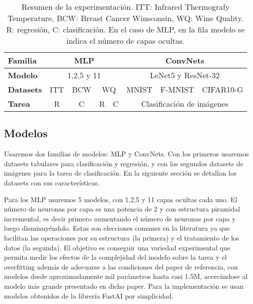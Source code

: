 \begin{table}[]
\begin{tabular}{|l|cccc|cll|}
\hline
\textbf{Familia} & \multicolumn{4}{c|}{MLP}                                                                                                                               & \multicolumn{3}{c|}{ConvNets}                                         \\ \hline
\textbf{Modelo}  & \multicolumn{4}{c|}{1,2,5 y 11}                                                                                                                        & \multicolumn{3}{c|}{LeNet5 y ResNet-32}                               \\ \hline
\textbf{Datasets}           & \multicolumn{1}{c|}{ITT} & \multicolumn{1}{c|}{BCW} & \multicolumn{2}{c|}{WQ}              & \multicolumn{1}{c|}{MNIST} & \multicolumn{1}{l|}{F-MNIST} & CIFAR10-G \\ \hline
\textbf{Tarea}             & \multicolumn{1}{c|}{R}                        & \multicolumn{1}{c|}{C}            & \multicolumn{1}{c|}{R} & C & \multicolumn{3}{c|}{Clasificación de imágenes}                        \\ \hline
\end{tabular}
\caption{Resumen de la experimentación. ITT: Infrared Thermografy Temperature, BCW: Breast Cancer Winsconsin, WQ: Wine Quality. R: regresión, C: clasificación. En el caso de MLP, en la fila modelo se indica el número de capas ocultas.}
\label{table:exp}
\end{table}

\subsection{Modelos}

Usaremos dos familias de modelos: MLP y ConvNets. Con los primeros usaremos datasets tabulares para clasificación y regresión, y con los segundos datasets de imágenes para la tarea de clasificación. En la siguiente sección se detallan los datasets con sus características.

Para los MLP usaremos 5 modelos, con 1,2,5 y 11 capas ocultas cada uno. El número de neuronas por capa es una potencia de 2 y con estructura piramidal incremental, es decir primero aumentando el número de neuronas por capa y luego disminuyéndolo. Estas son elecciones comunes en la literatura ya que facilitan las operaciones por su estructura (la primera) y el tratamiento de los datos (la segunda). El objetivo es conseguir una variedad experimental que permita medir los efectos de la complejidad del modelo sobre la tarea y el overfitting además de adecuarse a las condiciones del paper de referencia, con modelos desde aproximadamente mil parámetros hasta casi 1.5M, acercándose al modelo más grande presentado en dicho paper. Para la implementación se usan modelos obtenidos de la librería FastAI por simplicidad.

